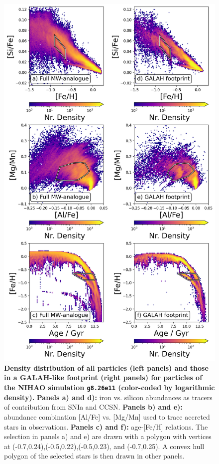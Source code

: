 \documentclass[fleqn,usenatbib]{mnras}
\begin{document}
\begin{figure}
	\includegraphics[width=\columnwidth]{figures/low_alpha_halo_convex_hull.png}
    \caption{
    \textbf{Density distribution of all particles (left panels) and those in a GALAH-like footprint (right panels) for particles of the NIHAO simulation \texttt{g8.26e11} (color-coded by logarithmic density).}
    \textbf{Panels a) and d):} iron vs. silicon abundances as tracers of contribution from SNIa and CCSN. \textbf{Panels b) and e):} abundance combination [Al/Fe] vs. [Mg/Mn] used to trace accreted stars in observations.
    \textbf{Panels c) and f):} age-[Fe/H] relations.  
    The selection in panels a) and e) are drawn with a polygon with vertices at (-0.7,0.24),(-0.5,0.22),(-0.5,0.23), and (-0.7,0.25). A convex hull polygon of the selected stars is then drawn in other panels.}
    \label{fig:low_alpha_halo}
\end{figure}
\end{document}
